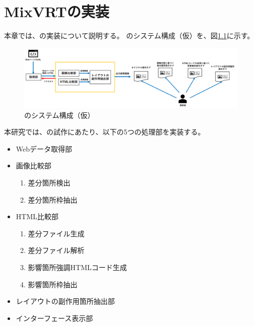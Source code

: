 \chapter{MixVRTの実装}\label{cha:Implementation}
本章では、\toolName の実装について説明する。
\toolName のシステム構成（仮）を、図\ref{fig:System}に示す。
\begin{figure}[tp]
    \begin{center}
        \includegraphics[width=1.0\columnwidth]{image/4_System.png}
        \caption{\toolName のシステム構成（仮）}
        \label{fig:System}
    \end{center}
\end{figure}
本研究では、\toolName の試作にあたり、以下の5つの処理部を実装する。
\begin{itemize}
    \item Webデータ取得部
    \item 画像比較部
          \begin{enumerate}
              \item 差分箇所検出
              \item 差分箇所枠抽出
          \end{enumerate}
    \item HTML比較部
          \begin{enumerate}
              \item 差分ファイル生成
              \item 差分ファイル解析
              \item 影響箇所強調HTMLコード生成
              \item 影響箇所枠抽出
          \end{enumerate}
    \item レイアウトの副作用箇所抽出部
    \item インターフェース表示部
\end{itemize}
